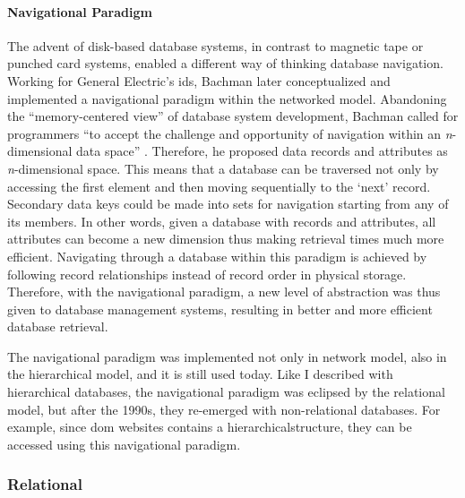 \paragraph{Navigational Paradigm}  The advent of disk-based database systems, in contrast to magnetic tape or punched card systems, enabled a different way of thinking database navigation. Working for General Electric's \gls{ids}, Bachman \parencite{Bachman:1973:PN:355611.362534} later conceptualized and implemented a navigational paradigm within the networked model. Abandoning the ``memory-centered view'' of database system development, Bachman called for programmers ``to accept the challenge and opportunity of navigation within an \textit{n}-dimensional data space'' \parencite[657]{Bachman:1973:PN:355611.362534}. Therefore, he proposed data records and attributes as \textit{n}-dimensional space. This means that a database can be traversed not only by accessing the first element and then moving sequentially to the `next' record. Secondary data keys could be made into sets for navigation starting from any of its members. In other words, given a database with records and attributes, all attributes can become a new dimension thus making retrieval times much more efficient. Navigating through a database within this paradigm is achieved by following record relationships instead of record order in physical storage. Therefore, with the navigational paradigm, a new level of abstraction was thus given to database management systems, resulting in better and more efficient database retrieval.

The navigational paradigm was implemented not only in network model, also in the hierarchical model, and it is still used today. Like I described with hierarchical databases, the navigational paradigm was eclipsed by the relational model, but after the 1990s, they re-emerged with non-relational databases. For example, since \gls{dom} websites contains a hierarchicalstructure, they can be accessed using this navigational paradigm.

\subsubsection{Relational}
\label{model:relational}


